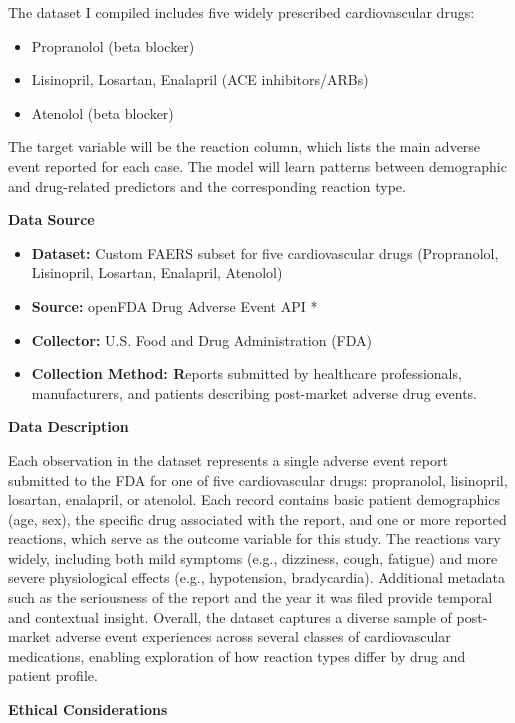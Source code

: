 \documentclass[
  letterpaper,
  DIV=11,
  numbers=noendperiod]{scrartcl}
\begin{document}
The dataset I compiled includes five widely prescribed cardiovascular
drugs:

\begin{itemize}
\item
  Propranolol (beta blocker)
\item
  Lisinopril, Losartan, Enalapril (ACE inhibitors/ARBs)
\item
  Atenolol (beta blocker)
\end{itemize}

The target variable will be the reaction column, which lists the main
adverse event reported for each case. The model will learn patterns
between demographic and drug-related predictors and the corresponding
reaction type.

\textbf{Data Source}

\begin{itemize}
\item
  \textbf{Dataset:} Custom FAERS subset for five cardiovascular drugs
  (Propranolol, Lisinopril, Losartan, Enalapril, Atenolol)
\item
  \textbf{Source:} openFDA Drug Adverse Event API *
\item
  \textbf{Collector:} U.S. Food and Drug Administration (FDA)
\item
  \textbf{Collection Method: R}eports submitted by healthcare
  professionals, manufacturers, and patients describing post-market
  adverse drug events.
\end{itemize}

\textbf{Data Description}

Each observation in the dataset represents a single adverse event report
submitted to the FDA for one of five cardiovascular drugs: propranolol,
lisinopril, losartan, enalapril, or atenolol. Each record contains basic
patient demographics (age, sex), the specific drug associated with the
report, and one or more reported reactions, which serve as the outcome
variable for this study. The reactions vary widely, including both mild
symptoms (e.g., dizziness, cough, fatigue) and more severe physiological
effects (e.g., hypotension, bradycardia). Additional metadata such as
the seriousness of the report and the year it was filed provide temporal
and contextual insight. Overall, the dataset captures a diverse sample
of post-market adverse event experiences across several classes of
cardiovascular medications, enabling exploration of how reaction types
differ by drug and patient profile.

\textbf{Ethical Considerations}
\end{document}

